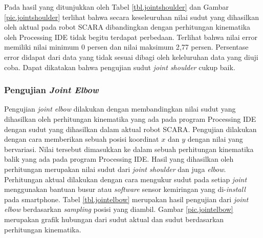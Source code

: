 Pada hasil yang ditunjukkan oleh Tabel \ref{tbl.jointshoulder} dan Gambar \ref{pic.jointshoulder} terlihat bahwa secara keseleuruhan nilai sudut yang dihasilkan oleh aktual pada robot SCARA dibandingkan dengan perhitungan kinematika oleh Processing IDE tidak begitu terdapat perbedaan. Terlihat bahwa nilai error
 memiliki nilai minimum 0 persen dan nilai maksimum 2,77 persen. Persentase error didapat dari data yang tidak sesuai dibagi oleh keleluruhan data yang diuji coba. Dapat dikatakan bahwa pengujian sudut \textit{joint shoulder} cukup baik.
 
 \subsubsection{Pengujian \textit{Joint Elbow}}
 Pengujian \textit{joint elbow} dilakukan dengan membandingkan nilai sudut yang dihasilkan oleh perhitungan kinematika yang ada pada program Processing IDE dengan sudut yang dihasilkan dalam aktual robot SCARA. Pengujian dilakukan dengan cara memberikan sebuah posisi koordinat $x$ dan $y$ dengan nilai yang bervariasi. Nilai tersebut dimasukkan ke dalam sebuah perhitungan kinematika balik yang ada pada program Processing IDE. Hasil yang dihasilkan oleh perhitungan merupakan nilai sudut dari \textit{joint shoulder} dan juga \textit{elbow}. Perhitungan aktual dilakukan dengan cara mengukur sudut pada setiap \textit{joint} menggunakan bantuan busur atau \textit{software} sensor kemiringan yang di-\textit{install} pada smartphone. Tabel \ref{tbl.jointelbow} merupakan hasil pengujian dari \textit{joint elbow} berdasarkan \textit{sampling} posisi yang diambil. Gambar \ref{pic.jointelbow} merupakan grafik hubungan dari sudut aktual dan sudut berdasarkan perhitungan kinematika. 
 

